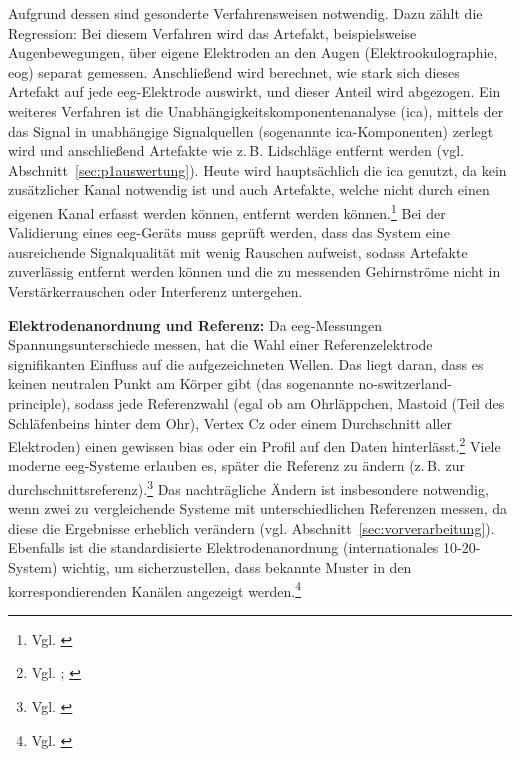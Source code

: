 Aufgrund dessen sind gesonderte Verfahrensweisen notwendig. Dazu zählt die Regression: Bei diesem Verfahren wird das Artefakt, beispielsweise Augenbewegungen, über eigene Elektroden an den Augen (Elektrookulographie, \acrshort{eog}) separat gemessen. Anschließend wird berechnet, wie stark sich dieses Artefakt auf jede \acrshort{eeg}-Elektrode auswirkt, und dieser Anteil wird abgezogen. Ein weiteres Verfahren ist die Unabhängigkeitskomponentenanalyse (\acrshort{ica}), mittels der das Signal in unabhängige Signalquellen (sogenannte \acrshort{ica}-Komponenten) zerlegt wird und anschließend Artefakte wie z.\,B. Lidschläge entfernt werden (vgl. Abschnitt~\ref{sec:p1auswertung}). Heute wird hauptsächlich die \acrshort{ica} genutzt, da kein zusätzlicher Kanal notwendig ist und auch Artefakte, welche nicht durch einen eigenen Kanal erfasst werden können, entfernt werden können.\footnote{Vgl. \cite[S.~2, 5]{jiang2019}} Bei der Validierung eines \acrshort{eeg}-Geräts muss geprüft werden, dass das System eine ausreichende Signalqualität mit wenig Rauschen aufweist, sodass Artefakte zuverlässig entfernt werden können und die zu messenden Gehirnströme nicht in Verstärkerrauschen oder Interferenz untergehen.

\textbf{Elektrodenanordnung und Referenz:} Da \acrshort{eeg}-Messungen Spannungsunterschiede messen, hat die Wahl einer Referenzelektrode signifikanten Einfluss auf die aufgezeichneten Wellen. Das liegt daran, dass es keinen neutralen Punkt am Körper gibt (das sogenannte \gls{no-switzerland-principle}), sodass jede Referenzwahl (egal ob am Ohrläppchen, Mastoid (Teil des Schläfenbeins hinter dem Ohr), Vertex Cz oder einem Durchschnitt aller Elektroden) einen gewissen \gls{bias} oder ein Profil auf den Daten hinterlässt.\footnote{Vgl. \cite[S.~533]{yao2019}; \cite[S.~R83]{biasiucci2019}} Viele moderne \acrshort{eeg}-Systeme erlauben es, später die Referenz zu ändern (z.\,B. zur \gls{durchschnittsreferenz}).\footnote{Vgl. \cite[S.~535]{yao2019}} Das nachträgliche Ändern ist insbesondere notwendig, wenn zwei zu vergleichende Systeme mit unterschiedlichen Referenzen messen, da diese die Ergebnisse erheblich verändern (vgl. Abschnitt~\ref{sec:vorverarbeitung}). Ebenfalls ist die standardisierte Elektrodenanordnung (internationales 10-20-System) wichtig, um sicherzustellen, dass bekannte Muster in den korrespondierenden Kanälen angezeigt werden.\footnote{Vgl. \cite{acns_guideline2}}

